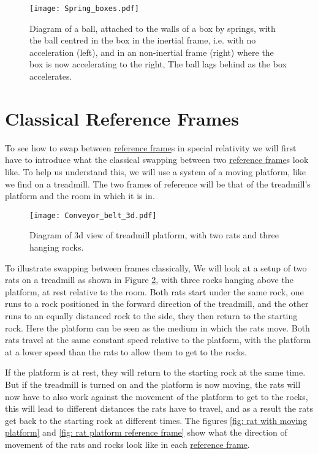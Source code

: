 \begin{figure}[H]
\centering
       \texttt{[image: Spring\_boxes.pdf]}
    \caption{Diagram of a ball, attached to the walls of a box by springs, with the ball centred in the box in the inertial frame, i.e. with no acceleration (left), and in an non-inertial frame (right) where the box is now accelerating to the right, The ball lags behind as the box accelerates.}
    \label{fig: spring boxes}
\end{figure}


\section{Classical Reference Frames}

To see how to swap between \hyperlink{def-Reference-frame}{reference frame}s in special relativity we will first have to introduce what the classical swapping between two \hyperlink{def-Reference-frame}{reference frame}s look like. To help us understand this, we will use a system of a moving platform, like we find on a treadmill. The two frames of reference will be that of the treadmill's platform and the room in which it is in.

\begin{figure}[H]
    \centering
    \texttt{[image: Conveyor\_belt\_3d.pdf]}
    \caption{Diagram of 3d view of treadmill platform, with two rats and three hanging rocks.}
    \label{fig: 3d conveyor belt}
\end{figure}

To illustrate swapping between frames classically, We will look at a setup of two rats on a treadmill as shown in Figure \ref{fig: 3d conveyor belt}, with three rocks hanging above the platform, at rest relative to the room. Both rats start under the same rock, one runs to a rock positioned in the forward direction of the treadmill, and the other runs to an equally distanced rock to the side, they then return to the starting rock. Here the platform can be seen as the medium in which the rats move. Both rats travel at the same constant speed relative to the platform, with the platform at a lower speed than the rats to allow them to get to the rocks. 

If the platform is at rest, they will return to the starting rock at the same time. But if the treadmill is turned on and the platform is now moving, the rats will now have to also work against the movement of the platform to get to the rocks, this will lead to different distances the rats have to travel, and as a result the rats get back to the starting rock at different times. The figures \ref{fig: rat with moving platform} and \ref{fig: rat platform reference frame} show what the direction of movement of the rats and rocks look like in each \hyperlink{def-Reference-frame}{reference frame}.

